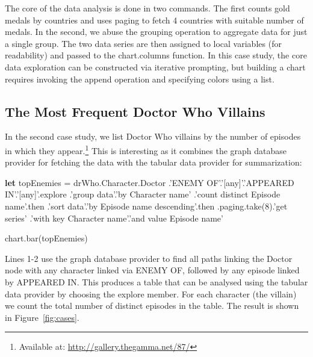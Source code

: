\documentclass{sigchi}
\newcommand{\kvd}[1]{\textbf{#1}}
\newcommand{\ikvd}[1]{{\fontfamily{zi4}\selectfont\small #1}}
\begin{document}

The core of the data analysis is done in two commands. The first counts gold medals by countries
and uses paging to fetch 4 countries with suitable number of medals. In the second, we abuse the
grouping operation to aggregate data for just a single group. The two data series are then assigned
to local variables (for readability) and passed to the \ikvd{chart.columns} function.
In this case study, the core data exploration can be constructed via iterative prompting, but
building a chart requires invoking the \ikvd{append} operation and specifying colors using a list.

\subsection{The Most Frequent Doctor Who Villains}
In the second case study, we list Doctor Who villains by the number of episodes in which they
appear.\footnote{Available at: \url{http://gallery.thegamma.net/87/}} This is interesting as it
combines the graph database provider for fetching the data with the tabular data provider for
summarization:

\begin{thegamma}
\kvd{let} topEnemies = drWho.Character.Doctor
  .'ENEMY OF'.'[any]'.'APPEARED IN'.'[any]'.explore
  .'group data'.'by Character name'
    .'count distinct Episode name'.then
  .'sort data'.'by Episode name descending'.then
  .paging.take(8).'get series'
    .'with key Character name'.'and value Episode name'

chart.bar(topEnemies)
\end{thegamma}

Lines 1-2 use the graph database provider to find all paths linking the Doctor node with any
character linked via \ikvd{ENEMY OF}, followed by any episode linked by \ikvd{APPEARED IN}.
This produces a table that can be analysed using the tabular data provider by choosing the
\ikvd{explore} member. For each character (the villain) we count the total number of
distinct episodes in the table. The result is shown in Figure~\ref{fig:cases}.
\end{document}
